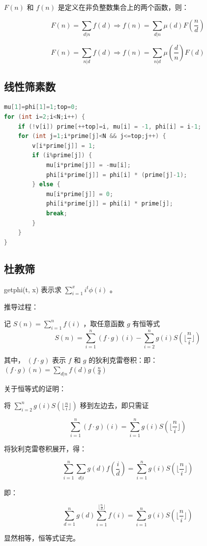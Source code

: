 \documentclass{article}
\begin{document}
$F(n)$ 和 $f(n)$ 是定义在非负整数集合上的两个函数，则：

$$F(n) = \sum\limits_{d|n}f(d) \Rightarrow f(n) = \sum\limits_{d|n} \mu(d) F(\frac{n}{d}) $$

$$F(n) = \sum\limits_{n|d}f(d) \Rightarrow f(n) = \sum\limits_{n|d} \mu(\frac{d}{n}) F(d) $$


\subsection{线性筛素数}
\begin{lstlisting}[language=C++]
mu[1]=phi[1]=1;top=0;
for (int i=2;i<N;i++) {
	if (!v[i]) prime[++top]=i, mu[i] = -1, phi[i] = i-1;
	for (int j=1;i*prime[j]<N && j<=top;j++) {
		v[i*prime[j]] = 1;
		if (i%prime[j]) {
			mu[i*prime[j]] = -mu[i];
			phi[i*prime[j]] = phi[i] * (prime[j]-1);
		} else {
			mu[i*prime[j]] = 0;
			phi[i*prime[j]] = phi[i] * prime[j];
			break;
		}
	}
}
\end{lstlisting}
\subsection{杜教筛}
getphi(t, x) 表示求 $\sum\limits_{i = 1}^{x} i^t \phi(i)$ 。

推导过程：

记 $S(n) = \sum\limits_{i = 1}^{n} f(i)$ ，取任意函数 $g$ 有恒等式
$$S(n) = \sum\limits_{i = 1}^{n} (f \cdot g) (i) - \sum\limits_{i = 2}^{n} g(i) S(\lfloor \frac{n}{i} \rfloor)$$

其中， $(f \cdot g)$ 表示 $f$ 和 $g$ 的狄利克雷卷积：即： $(f \cdot g) (n) = \sum\limits_{d | n} f(d)g(\frac{n}{d})$

关于恒等式的证明：

将 $\sum\limits_{i = 2}^{n} g(i)S(\lfloor \frac{n}{i} \rfloor)$ 移到左边去，即只需证

$$\sum\limits_{i = 1}^{n} (f \cdot g) (i) = \sum\limits_{i = 1}^{n} g(i) S(\lfloor \frac{n}{i} \rfloor)$$

将狄利克雷卷积展开，得：

$$\sum\limits_{i = 1}^{n} \sum\limits_{d | i} g(d) f(\frac{i}{d}) = \sum\limits_{i = 1}^{n} g(i) S(\lfloor \frac{n}{i} \rfloor)$$

即：

$$\sum\limits_{d = 1}^{n} g(d) \sum\limits_{i = 1}^{\lfloor \frac{n}{d} \rfloor} f(i) = \sum\limits_{i = 1}^{n} g(i) S(\lfloor \frac{n}{i} \rfloor)$$

显然相等，恒等式证完。
\end{document}
